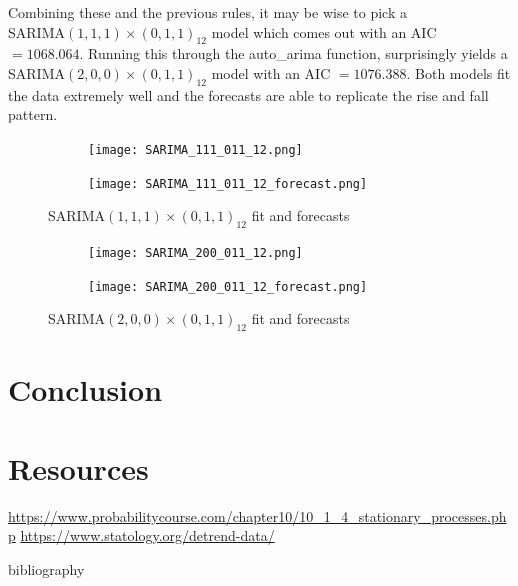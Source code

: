 \documentclass{article}
\begin{document}
  Combining these and the previous rules, it may be wise to pick a\\
  SARIMA$(1,1,1)\times(0,1,1)_{12}$ model which comes out with an AIC $=1068.064$. Running this through the
  auto\_arima function, surprisingly yields a SARIMA$(2,0,0)\times(0,1,1)_{12}$ model with an AIC $=1076.388$. Both models fit the data extremely well and the forecasts are able to replicate the rise and fall pattern.

  \begin{figure}[H]
    \centering
    \captionsetup{justification=centering}
    \begin{subfigure}[b]{\linewidth}
      \texttt{[image: SARIMA\_111\_011\_12.png]}
    \end{subfigure}
    \begin{subfigure}[b]{\linewidth}
      \texttt{[image: SARIMA\_111\_011\_12\_forecast.png]}
    \end{subfigure}
    \caption{SARIMA$(1,1,1)\times(0,1,1)_{12}$ fit and forecasts}
  \end{figure}

  \begin{figure}[H]
    \centering
    \captionsetup{justification=centering}
    \begin{subfigure}[b]{\linewidth}
      \texttt{[image: SARIMA\_200\_011\_12.png]}
    \end{subfigure}
    \begin{subfigure}[b]{\linewidth}
      \texttt{[image: SARIMA\_200\_011\_12\_forecast.png]}
    \end{subfigure}
    \caption{SARIMA$(2,0,0)\times(0,1,1)_{12}$ fit and forecasts}
  \end{figure}

  \section{Conclusion}

  \section{Resources}
  \url{https://www.probabilitycourse.com/chapter10/10_1_4_stationary_processes.php}
  \url{https://www.statology.org/detrend-data/}

  bibliography\cite{articleFactCheck}
  \printbibliography
\end{document}
